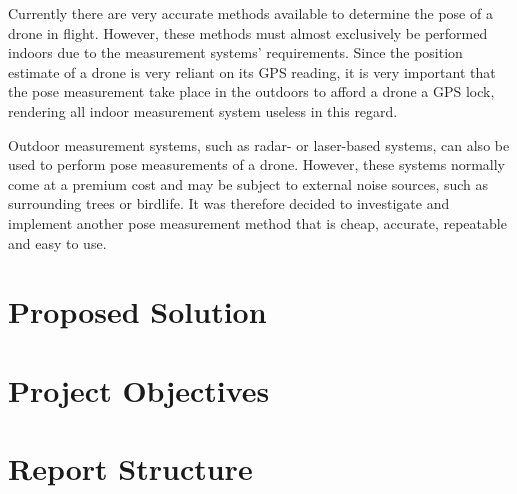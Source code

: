 Currently there are very accurate methods available to determine the pose of a drone in flight. However, these methods must almost exclusively be performed indoors due to the measurement systems' requirements. Since the position estimate of a drone is very reliant on its GPS reading, it is very important that the pose measurement take place in the outdoors to afford a drone a GPS lock, rendering all indoor measurement system useless in this regard. 

Outdoor measurement systems, such as radar- or laser-based systems, can also be used to perform pose measurements of a drone. However, these systems normally come at a premium cost and may be subject to external noise sources, such as surrounding trees or birdlife. It was therefore decided to investigate and implement another pose measurement method that is cheap, accurate, repeatable and easy to use. 

\section{Proposed Solution}

\section{Project Objectives}

\section{Report Structure}
